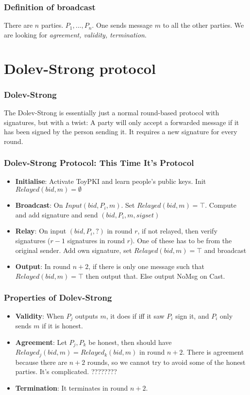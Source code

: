     \begin{frame}
        \frametitle{Definition of broadcast}
            There are $n$ parties. $P_1, ..., P_n$. One sends message $m$ to all the other parties. We are looking for \textit{agreement, validity, termination}. 
    \end{frame}


\section{Dolev-Strong protocol}
    \begin{frame}
        \frametitle{Dolev-Strong}
            The Dolev-Strong is essentially just a normal round-based protocol with signatures, but with a twist: A party will only accept a forwarded message if it has been signed by the person sending it. It requires a new signature for every round. 
    \end{frame}

    \begin{frame}
        \frametitle{Dolev-Strong Protocol: This Time It's Protocol}
            \begin{itemize}
               \item \textbf{Initialise}: Activate ToyPKI and learn people's public keys. Init $Relayed(bid, m) = \emptyset$
               \item \textbf{Broadcast}: On $Input(bid, P_i, m)$. Set $Relayed(bid, m) = \top$. Compute and add signature and send $(bid, P_i, m, sigset)$
               \item \textbf{Relay}: On input $(bid, P_i, ?)$ in round $r$, if not relayed, then verify signatures ($r-1$ signatures in round $r$). One of these has to be from the original sender. Add own signature, set $Relayed(bid, m) = \top$ and broadcast
               \item \textbf{Output}: In round $n+2$, if there is only one message such that $Relayed(bid, m) = \top$ then output that. Else output NoMsg on Cast. 
            \end{itemize}
    \end{frame}

    \begin{frame}
        \frametitle{Properties of Dolev-Strong}
            \begin{itemize}
                \item \textbf{Validity}: When $P_j$ outputs $m$, it does if iff it saw $P_i$ sign it, and $P_i$ only sends $m$ if it is honest.
                \item \textbf{Agreement}: Let $P_j, P_k$ be honest, then should have $Relayed_j(bid, m) = Relayed_k(bid, m)$ in round $n+2$. There is agreement because there are $n+2$ rounds, so we cannot try to avoid some of the honest parties. It's complicated. ????????
                \item \textbf{Termination}: It terminates in round $n+2$.  
            \end{itemize}
    
    \end{frame}

